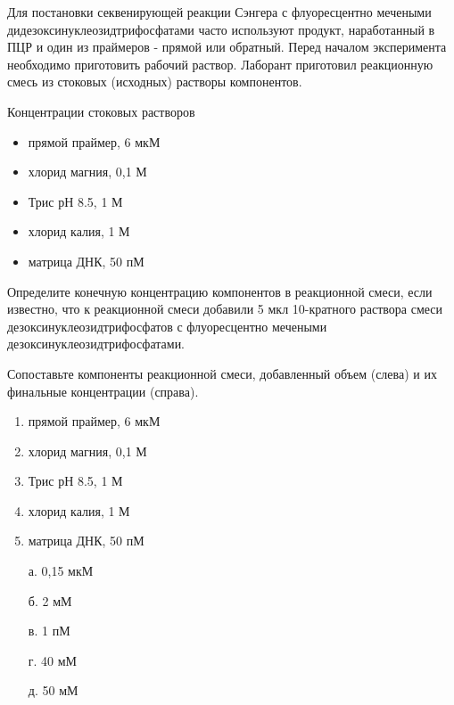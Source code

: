 
Для постановки секвенирующей реакции Сэнгера с флуоресцентно мечеными дидезоксинуклеозидтрифосфатами часто используют продукт, наработанный в ПЦР и один из праймеров - прямой или обратный. Перед началом эксперимента необходимо приготовить рабочий раствор. Лаборант приготовил реакционную смесь из стоковых (исходных) растворы компонентов.

Концентрации стоковых растворов

\begin{itemize}
    \item прямой праймер, 6 мкМ
    \item хлорид магния, 0,1 М
    \item Трис рН 8.5, 1 М
    \item хлорид калия, 1 М
    \item матрица ДНК, 50 пМ
\end{itemize}

Определите конечную концентрацию компонентов в реакционной смеси, если известно, что к реакционной смеси добавили 5 мкл 10-кратного раствора смеси дезоксинуклеозидтрифосфатов с флуоресцентно мечеными дезоксинуклеозидтрифосфатами.

Сопоставьте компоненты реакционной смеси, добавленный объем (слева) и их финальные концентрации (справа).

\begin{multicols}{2}
    {
        \begin{enumerate}
            \item прямой праймер, 6 мкМ
            \item хлорид магния, 0,1 М
            \item Трис рН 8.5, 1 М
            \item хлорид калия, 1 М
            \item матрица ДНК, 50 пМ
        \end{enumerate}
    }

    {
        \begin{enumerate}
            \item[а.] 0,15 мкМ
            \item[б.] 2 мМ
            \item[в.] 1 пМ
            \item[г.] 40 мМ
            \item[д.] 50 мМ
        \end{enumerate}
    }
    
\end{multicols}
